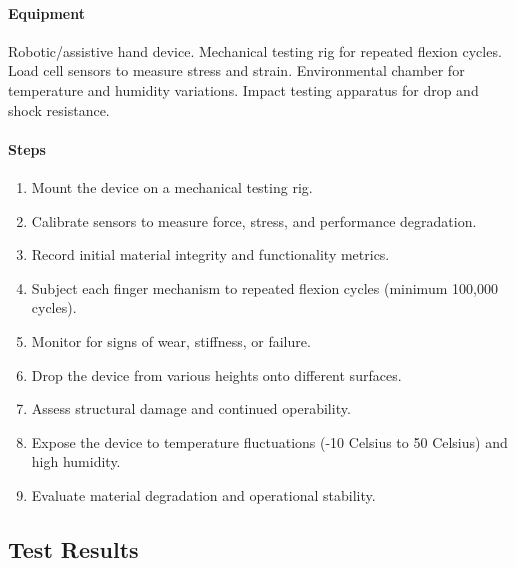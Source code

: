 \documentclass{article}
\begin{document}
\paragraph{Equipment} Robotic/assistive hand device. Mechanical testing rig for repeated flexion cycles. Load cell sensors to measure stress and strain. Environmental chamber for temperature and humidity variations. Impact testing apparatus for drop and shock resistance.

\paragraph{Steps}
\begin{enumerate}
    \item Mount the device on a mechanical testing rig.
    \item Calibrate sensors to measure force, stress, and performance degradation.
    \item Record initial material integrity and functionality metrics.
    \item Subject each finger mechanism to repeated flexion cycles (minimum 100,000 cycles).
    \item Monitor for signs of wear, stiffness, or failure.
    \item Drop the device from various heights onto different surfaces. 
    \item Assess structural damage and continued operability.
    \item Expose the device to temperature fluctuations (-10 Celsius to 50 Celsius) and high humidity.
    \item Evaluate material degradation and operational stability.
\end{enumerate}

\subsection{Test Results}
\end{document}
